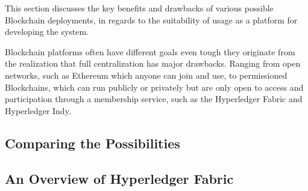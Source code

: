 This section discusses the key benefits and drawbacks of various possible
Blockchain deployments, in regards to the suitability of usage as a platform
for developing the system.

Blockchain platforms often have different goals even tough they originate from
the realization that full centralization has major drawbacks. Ranging from open
networks, such as Ethereum which anyone can join and use, to permissioned
Blockchains, which can run publicly or privately but are only open to access
and participation through a membership service, such as the Hyperledger Fabric
and Hyperledger Indy.

\subsection{Comparing the Possibilities}

\subsection{An Overview of Hyperledger Fabric}
